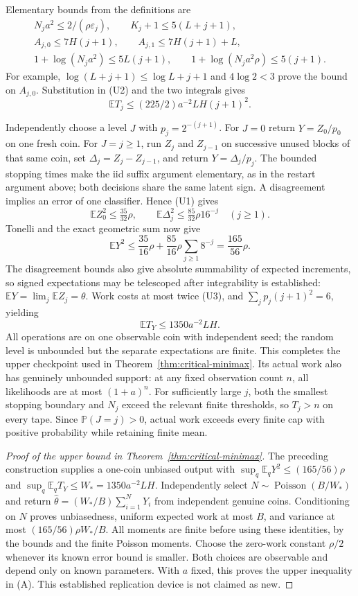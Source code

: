 \documentclass[11pt]{article}
\newcommand{\E}{\mathbb E}
\newcommand{\Pp}{\mathbb P}
\begin{document}
Elementary bounds from the definitions are
\[
\begin{gathered}
 N_ja^2\le2/(\rho\varepsilon_j),\qquad K_j+1\le5(L+j+1),\\
 A_{j,0}\le7H(j+1),\qquad A_{j,1}\le7H(j+1)+L,\\
 1+\log(N_ja^2)\le5L(j+1),\qquad
 1+\log(N_ja^2\rho)\le5(j+1).
\end{gathered}
\]
For example, $\log(L+j+1)\le\log L+j+1$ and $4\log2<3$ prove the
bound on $A_{j,0}$. Substitution in (U2) and the two integrals gives
\[
 \E T_j\le(225/2)a^{-2}LH(j+1)^2.                        \tag{U3}
\]

Independently choose a level $J$ with $p_j=2^{-(j+1)}$. For $J=0$ return
$Y=Z_0/p_0$ on one fresh coin. For $J=j\ge1$, run $Z_j$ and $Z_{j-1}$
on successive unused blocks of that same coin, set $\Delta_j=Z_j-Z_{j-1}$,
and return $Y=\Delta_j/p_j$. The bounded stopping times make the iid suffix
argument elementary, as in the restart argument above; both decisions share
the same latent sign. A disagreement implies an error of one classifier.
Hence (U1) gives
\[
 \E Z_0^2\le\tfrac{35}{32}\rho,
 \qquad \E\Delta_j^2\le\tfrac{85}{32}\rho16^{-j}\quad(j\ge1).
\]
Tonelli and the exact geometric sum now give
\[
 \E Y^2\le\frac{35}{16}\rho+
                 \frac{85}{16}\rho\sum_{j\ge1}8^{-j}
            =\frac{165}{56}\rho.
\]
The disagreement bounds also give absolute summability of expected increments,
so signed expectations may be telescoped after integrability is established:
$\E Y=\lim_j\E Z_j=\theta$. Work costs at most twice (U3), and
$\sum_jp_j(j+1)^2=6$, yielding
\[
 \E T_Y\le1350a^{-2}LH.
\]
All operations are on one observable coin with independent seed; the random
level is unbounded but the separate expectations are finite. This completes
the upper checkpoint used in Theorem~\ref{thm:critical-minimax}.
Its actual work also has genuinely unbounded support: at any fixed observation
count $n$, all likelihoods are at most $(1+a)^n$. For sufficiently large $j$,
both the smallest stopping boundary and $N_j$ exceed the relevant finite
thresholds, so $T_j>n$ on every tape. Since $\Pp(J=j)>0$, actual work exceeds
every finite cap with positive probability while retaining finite mean.



\begin{proof}[Proof of the upper bound in Theorem~\ref{thm:critical-minimax}]
The preceding construction supplies a one-coin unbiased output with
$\sup_q\E_qY^2\le(165/56)\rho$ and
$\sup_q\E_qT_Y\le W_*=1350a^{-2}LH$. Independently select
$N\sim\operatorname{Poisson}(B/W_*)$ and return
$\widehat\theta=(W_*/B)\sum_{i=1}^NY_i$ from independent genuine coins.
Conditioning on $N$ proves unbiasedness, uniform expected work at most $B$,
and variance at most $(165/56)\rho W_*/B$. All moments are finite before
using these identities, by the bounds and the finite Poisson moments.
Choose the zero-work constant $\rho/2$ whenever its known error bound is
smaller. Both choices are observable and depend only on known parameters.
With $a$ fixed, this proves the upper inequality in (A). This established
replication device is not claimed as new.
\end{proof}
\end{document}
